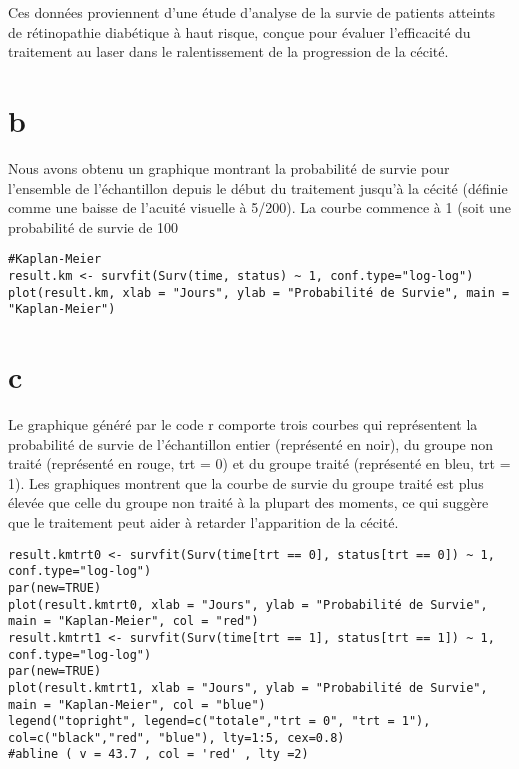 \documentclass[../main.tex]{subfiles}
\begin{document}
\begin{CJK*}{UTF8}{gbsn}
Ces données proviennent d'une étude d'analyse de la survie de patients atteints de rétinopathie diabétique à haut risque, conçue pour évaluer l'efficacité du traitement au laser dans le ralentissement de la progression de la cécité.

\section{b}
Nous avons obtenu un graphique montrant la probabilité de survie pour l'ensemble de l'échantillon depuis le début du traitement jusqu'à la cécité (définie comme une baisse de l'acuité visuelle à 5/200). La courbe commence à 1 (soit une probabilité de survie de 100 %

\begin{lstlisting}
#Kaplan-Meier 
result.km <- survfit(Surv(time, status) ~ 1, conf.type="log-log")
plot(result.km, xlab = "Jours", ylab = "Probabilité de Survie", main = "Kaplan-Meier")

\end{lstlisting}

\section{c}
Le graphique généré par le code r comporte trois courbes qui représentent la probabilité de survie de l'échantillon entier (représenté en noir), du groupe non traité (représenté en rouge, trt = 0) et du groupe traité (représenté en bleu, trt = 1). Les graphiques montrent que la courbe de survie du groupe traité est plus élevée que celle du groupe non traité à la plupart des moments, ce qui suggère que le traitement peut aider à retarder l'apparition de la cécité.

\begin{lstlisting}
result.kmtrt0 <- survfit(Surv(time[trt == 0], status[trt == 0]) ~ 1, conf.type="log-log")
par(new=TRUE)
plot(result.kmtrt0, xlab = "Jours", ylab = "Probabilité de Survie", main = "Kaplan-Meier", col = "red")
result.kmtrt1 <- survfit(Surv(time[trt == 1], status[trt == 1]) ~ 1, conf.type="log-log")
par(new=TRUE)
plot(result.kmtrt1, xlab = "Jours", ylab = "Probabilité de Survie", main = "Kaplan-Meier", col = "blue")
legend("topright", legend=c("totale","trt = 0", "trt = 1"), col=c("black","red", "blue"), lty=1:5, cex=0.8)
#abline ( v = 43.7 , col = 'red' , lty =2)
\end{lstlisting}


\end{CJK*}
\end{document}
